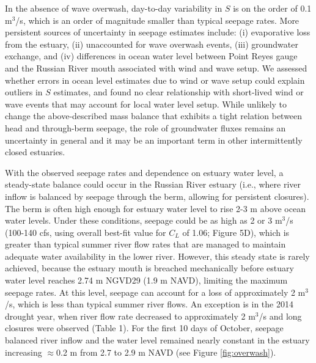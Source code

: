 \documentclass[preprint,12pt,authoryear]{elsarticle}
\begin{document}
In the absence of wave overwash,  day-to-day variability in $S$ is on the order of 0.1 m$^3$/s, which is an order of magnitude smaller than typical seepage rates. More persistent sources of uncertainty in seepage estimates include: 
(i)  evaporative loss from the estuary, 
(ii) unaccounted for wave overwash events, 
(iii) groundwater exchange, and 
(iv) differences in ocean water level between Point Reyes gauge and the Russian River mouth associated with wind and wave setup. 
We assessed whether errors in ocean level estimates due to wind or wave setup could  explain outliers in $S$ estimates, and found no clear relationship with short-lived wind or wave events that may account for local water level setup. 
While unlikely to change the above-described mass balance that exhibits a tight relation between head and through-berm seepage, the role of groundwater fluxes remains an uncertainty in general and it may be an important term in other intermittently closed estuaries.

With the observed seepage rates and dependence on estuary water level, a steady-state balance could occur in the Russian River estuary (i.e., where river inflow is balanced by seepage through the berm, allowing for persistent closures). The berm is often high enough for estuary water level to rise 2-3 m above ocean water levels. Under these conditions, seepage could be as high as 2 or 3 m$^3$/s (100-140 cfs, using overall best-fit value for $C_L$ of 1.06; Figure 5D), which is greater than typical summer river flow rates that are managed to maintain adequate water availability in the lower river.
However, this steady state is rarely achieved, because 
the estuary mouth is breached mechanically before estuary water level reaches 2.74 m NGVD29 (1.9 m NAVD), limiting the maximum seepage rates.
At this level, seepage can account for a loss of approximately 2 m$^3$/s, which is less than typical summer river flows. An exception is in the 2014 drought year, when river flow rate decreased to  approximately 2 m$^3$/s and long closures were observed (Table 1). For the first 10 days of October, seepage balanced river inflow and the water level remained nearly constant in the estuary increasing $\approx$0.2 m from 2.7 to 2.9 m NAVD (see Figure \ref{fig:overwash}). 
\end{document}
